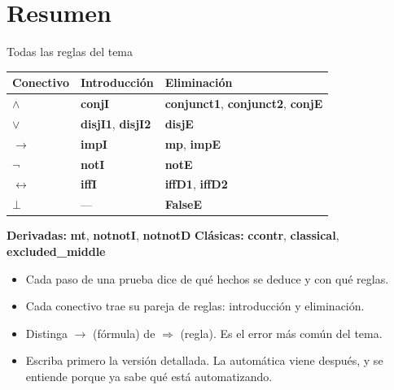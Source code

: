 \documentclass[11pt,aspectratio=169]{beamer}
\newcommand{\Rn}[1]{\textcolor{granate}{\textbf{#1}}}
\begin{document}
\section{Resumen}

\begin{frame}[fragile]{Todas las reglas del tema}
  \begin{center}
  \small
  \begin{tabular}{lll}
    \toprule
    \bfseries Conectivo & \bfseries Introducción & \bfseries Eliminación\\
    \midrule
    \pause
    \(\wedge\) & \Rn{conjI} & \Rn{conjunct1}, \Rn{conjunct2}, \Rn{conjE}\\
    \pause
    \(\vee\) & \Rn{disjI1}, \Rn{disjI2} & \Rn{disjE}\\
    \pause
    \(\longrightarrow\) & \Rn{impI} & \Rn{mp}, \Rn{impE}\\
    \pause
    \(\neg\) & \Rn{notI} & \Rn{notE}\\
    \pause
    \(\longleftrightarrow\) & \Rn{iffI} & \Rn{iffD1}, \Rn{iffD2}\\
    \pause
    \(\bot\) & --- & \Rn{FalseE}\\
    \bottomrule
  \end{tabular}
  \end{center}
  \vfill
  \pause
  \small
  \textbf{Derivadas:} \Rn{mt}, \Rn{notnotI}, \Rn{notnotD}\qquad
  \textbf{Clásicas:} \Rn{ccontr}, \Rn{classical}, \Rn{excluded\_middle}
  \vfill
\end{frame}

\begin{frame}
  \begin{itemize}
    \item Cada paso de una prueba dice \alert{de qué hechos se deduce} y
      \alert{con qué reglas}.
    \pause
    \item Cada conectivo trae su pareja de reglas: introducción y
      eliminación.
    \pause
    \item Distinga \(\longrightarrow\) (fórmula) de \(\Longrightarrow\)
      (regla). Es el error más común del tema.
    \pause
    \item Escriba primero la versión detallada. La automática viene
      después, y se entiende porque ya sabe qué está automatizando.
  \end{itemize}
  \vfill
\end{frame}
\end{document}
